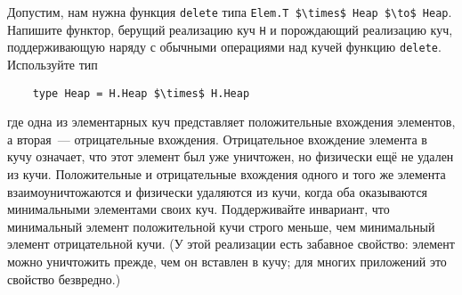 \begin{comment}
\begin{frame}[fragile]{}

%
%

Функция \hsinline{insert} работает за время $O(1)$ в худшем случае, а
\hsinline{merge}, \hsinline{findMin} и \hsinline{deleteMin}
работают за то же время, что и соответствующие функции для
обыкновенных биномиальных куч, то есть, за $O(\log n)$ в худшем
случае. Заметим, что каждая из различных фаз функции \hsinline{deleteMin}~---
поиск дерева с минимальным корнем, обращение его детей, слияние детей
с оставшимися деревьями и вставка дополнительных элементов,~---
занимает по $O(\log n)$.

Если нужно, мы можем улучшить время работы \hsinline{findMin} до
$O(1)$ при помощи функтора \hsinline{ExplicitMin} из
Упражнения~\ref{ex:3.7}. 
\end{frame}
\end{comment}


\ifanswers
\begin{frame}[fragile]{}
\begin{exercise}\label{ex:9.16}
  Допустим, нам нужна функция \lstinline!delete! типа
  \lstinline!Elem.T $\times$ Heap $\to$ Heap!.
  Напишите функтор, берущий реализацию куч \lstinline!H! и порождающий
  реализацию куч, поддерживающую наряду с обычными операциями над
  кучей функцию \lstinline!delete!. Используйте тип
  \begin{lstlisting}
    type Heap = H.Heap $\times$ H.Heap
  \end{lstlisting}
  где одна из элементарных куч представляет положительные вхождения
  элементов, а вторая~--- отрицательные вхождения. Отрицательное
  вхождение элемента в кучу означает, что этот элемент был уже
  уничтожен, но физически ещё не удален из кучи.  Положительные и
  отрицательные вхождения одного и того же элемента
  взаимоуничтожаются и физически удаляются из кучи, когда оба
  оказываются минимальными элементами своих куч.  Поддерживайте
  инвариант, что минимальный элемент положительной кучи строго меньше,
  чем минимальный элемент отрицательной кучи. (У этой реализации есть
  забавное свойство: элемент можно уничтожить прежде, чем он
  вставлен в кучу; для многих приложений это свойство безвредно.)
\end{exercise}
\end{frame}
\fi

